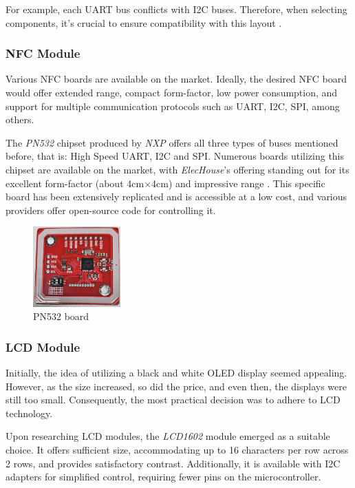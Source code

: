 For example, each UART bus conflicts with I2C buses. Therefore, when selecting components, it's crucial to ensure 
compatibility with this layout \cite{raspberrydocs}.


\subsubsection*{NFC Module}

Various NFC boards are available on the market. Ideally, the desired NFC board would offer extended range, compact 
form-factor, low power consumption, and support for multiple communication protocols such as UART, I2C, SPI, among others.

The \textit{PN532} chipset produced by \textit{NXP} offers all three types of buses mentioned before, that is: High Speed 
UART, I2C and SPI. Numerous boards utilizing this chipset are available on the market, with \textit{ElecHouse}'s offering 
standing out for its excellent form-factor (about 4cm$\times$4cm) and impressive range \cite{pn532_elechouse}. This specific board has been 
extensively replicated and is accessible at a low cost, and various providers offer open-source code for controlling it.

\begin{figure}[h]
	\centering
	\includegraphics[width = 0.3\textwidth]{Imagenes/Vectorial/PN532.pdf}
	\caption{PN532 board}
	\label{fig:pn532}
\end{figure}

\subsubsection*{LCD Module}

Initially, the idea of utilizing a black and white OLED display seemed appealing. However, as the size increased, so did 
the price, and even then, the displays were still too small. Consequently, the most practical decision was to adhere to 
LCD technology.

Upon researching LCD modules, the \textit{LCD1602} module emerged as a suitable choice. It offers sufficient size, 
accommodating up to 16 characters per row across 2 rows, and provides satisfactory contrast. Additionally, it is 
available with I2C adapters for simplified control, requiring fewer pins on the microcontroller.

